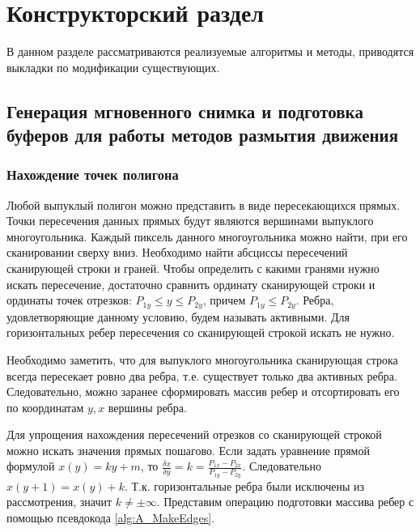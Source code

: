 \chapter{Конструкторский раздел}
\label{cha:design}

В данном разделе рассматриваются реализуемые алгоритмы и методы, приводятся выкладки по модификации существующих.

\section{Генерация мгновенного снимка и подготовка буферов для работы методов размытия движения}

\subsection{Нахождение точек полигона}

Любой выпуклый полигон можно представить в виде пересекающихся прямых. Точки пересечения данных прямых будут являются вершинами выпуклого многоугольника. Каждый пиксель данного многоугольника можно найти, при его сканировании сверху вниз. Необходимо найти абсциссы пересечений сканирующей строки и граней. Чтобы определить с какими гранями нужно искать пересечение, достаточно сравнить ординату сканирующей строки и ординаты точек отрезков: $P_{1y} \leq y \leq P_{2y}$, причем $P_{1y} \leq P_{2y}$. Ребра, удовлетворяющие данному условию, будем называть активными. Для горизонтальных ребер пересечения со сканирующей строкой искать не нужно.

Необходимо заметить, что для выпуклого многоугольника сканирующая строка всегда пересекает ровно два ребра, т.е. существует только два активных ребра. Следовательно, можно заранее сформировать массив ребер и отсортировать его по координатам $y,x$ вершины ребра. 

Для упрощения нахождения пересечений отрезков со сканирующей строкой можно искать значения прямых пошагово. Если задать уравнение прямой формулой $x(y) = ky + m$, то $\frac{\delta x}{\delta y} = k = \frac{P_{1x} - P_{2x}}{P_{1y} - P_{2y}}$. Следовательно $x(y + 1) = x(y) + k$. Т.к. горизонтальные ребра были исключены из рассмотрения, значит $k \neq \pm \infty$. Представим операцию подготовки массива ребер с помощью псевдокода \ref{alg:A_MakeEdges}.

